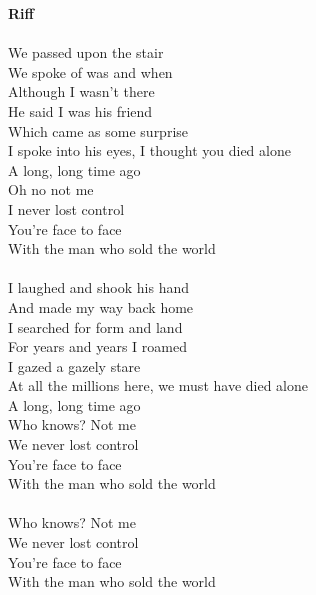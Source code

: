 \textbf{Riff}\\
   \\
We passed upon the stair\\
We spoke of was and when \\
Although I wasn't there \\
He said I was his friend \\
Which came as some surprise \\
I spoke into his eyes, I thought you died alone\\
A long, long time ago\\
Oh no not me\\
I never lost control\\
You're face to face\\
With the man who sold the world\\
   \\
I laughed and shook his hand\\
And made my way back home\\
I searched for form and land\\
For years and years I roamed\\
I gazed a gazely stare\\
At all the millions here, we must have died alone\\
A long, long time ago\\
Who knows? Not me\\
We never lost control\\
You're face to face\\
With the man who sold the world\\
   \\
Who knows? Not me\\
We never lost control\\
You're face to face\\
With the man who sold the world\\
   \\

